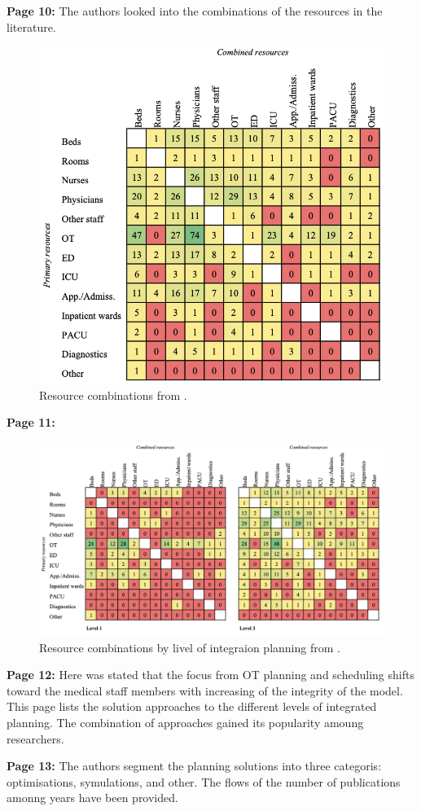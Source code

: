     \textbf{Page 10:}
    The authors looked into the combinations of the resources in the literature.
    \begin{figure}[H]
        \centering
        \includegraphics[width=.5\textwidth]{figures/0010_SR02NL23/fig4.png}
        \caption{Resource combinations from \cite{x338}.}
        \label{fig4:0010_SR02NL23}
    \end{figure}

    \textbf{Page 11:}
    \begin{figure}[H]
        \centering
        \includegraphics[width=1\textwidth]{figures/0010_SR02NL23/fig5.png}
        \caption{Resource combinations by livel of integraion planning from \cite{x338}.}
        \label{fig5:0010_SR02NL23}
    \end{figure}
    
    \textbf{Page 12:}
    Here was stated that the focus from OT planning and scheduling shifts toward the medical staff members with increasing of the integrity of the model. This page lists the solution approaches to the different levels of integrated planning. The combination of approaches gained its popularity amoung researchers.
    
    \textbf{Page 13:}
    The authors segment the planning solutions into three categoris: optimisations, symulations, and other. The flows of the number of publications amonng years have been provided.

